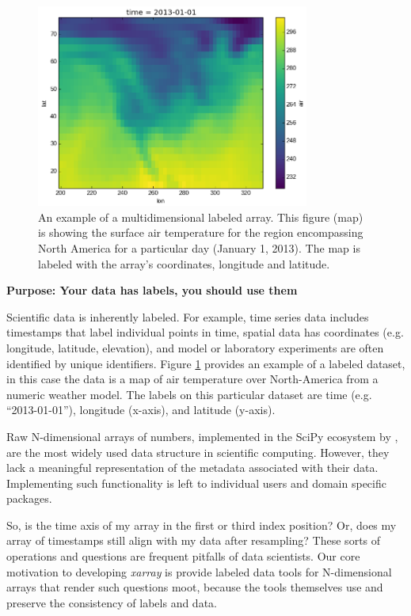 \documentclass{jors}
\begin{document}
\begin{figure}[h]
	\centering
	\includegraphics[width=0.8\textwidth]{plotting_kelvin_original}
	\caption{An example of a multidimensional labeled array. This figure (map) is showing the surface air temperature for the region encompassing North America for a particular day (January 1, 2013). The map is labeled with the array's coordinates, longitude and latitude.}
	\label{fig:temperature_map}
\end{figure}

\textbf{Purpose: Your data has labels, you should use them}

Scientific data is inherently labeled.
For example, time series data includes timestamps that label individual points in time, spatial data has coordinates (e.g. longitude, latitude, elevation), and model or laboratory experiments are often identified by unique identifiers.
Figure \ref{fig:temperature_map} provides an example of a labeled dataset, in this case the data is a map of air temperature over North-America from a numeric weather model.
The labels on this particular dataset are time (e.g. ``2013-01-01''), longitude (x-axis), and latitude (y-axis).

Raw N-dimensional arrays of numbers, implemented in the SciPy ecosystem by , are the most widely used data structure in scientific computing.
However, they lack a meaningful representation of the metadata associated with their data.
Implementing such functionality is left to individual users and domain specific packages.

So, is the time axis of my array in the first or third index position?
Or, does my array of timestamps still align with my data after resampling?
These sorts of operations and questions are frequent pitfalls of data scientists.
Our core motivation to developing \textit{xarray} is provide labeled data tools
for N-dimensional arrays that render such questions moot, because the tools
themselves use and preserve the consistency of labels and data.
\end{document}
